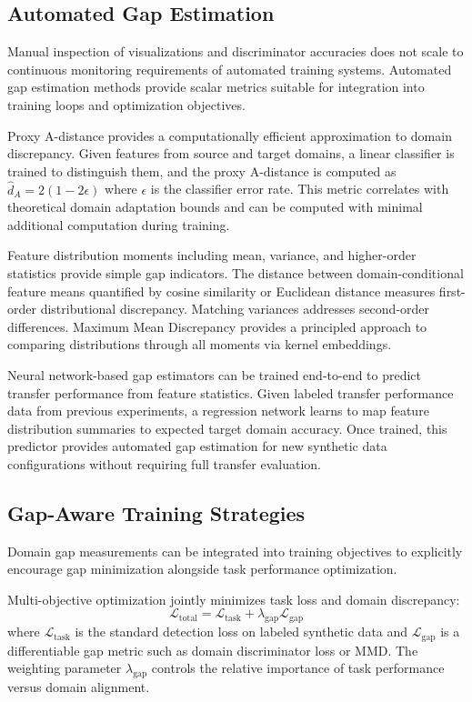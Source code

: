 \subsection{Automated Gap Estimation}

Manual inspection of visualizations and discriminator accuracies does not scale to continuous monitoring requirements of automated training systems. Automated gap estimation methods provide scalar metrics suitable for integration into training loops and optimization objectives.

Proxy A-distance provides a computationally efficient approximation to domain discrepancy. Given features from source and target domains, a linear classifier is trained to distinguish them, and the proxy A-distance is computed as $\hat{d}_A = 2(1 - 2\epsilon)$ where $\epsilon$ is the classifier error rate. This metric correlates with theoretical domain adaptation bounds and can be computed with minimal additional computation during training.

Feature distribution moments including mean, variance, and higher-order statistics provide simple gap indicators. The distance between domain-conditional feature means quantified by cosine similarity or Euclidean distance measures first-order distributional discrepancy. Matching variances addresses second-order differences. Maximum Mean Discrepancy provides a principled approach to comparing distributions through all moments via kernel embeddings.

Neural network-based gap estimators can be trained end-to-end to predict transfer performance from feature statistics. Given labeled transfer performance data from previous experiments, a regression network learns to map feature distribution summaries to expected target domain accuracy. Once trained, this predictor provides automated gap estimation for new synthetic data configurations without requiring full transfer evaluation.

\subsection{Gap-Aware Training Strategies}

Domain gap measurements can be integrated into training objectives to explicitly encourage gap minimization alongside task performance optimization.

Multi-objective optimization jointly minimizes task loss and domain discrepancy:
\begin{equation}
\mathcal{L}_{\text{total}} = \mathcal{L}_{\text{task}} + \lambda_{\text{gap}} \mathcal{L}_{\text{gap}}
\end{equation}
where $\mathcal{L}_{\text{task}}$ is the standard detection loss on labeled synthetic data and $\mathcal{L}_{\text{gap}}$ is a differentiable gap metric such as domain discriminator loss or MMD. The weighting parameter $\lambda_{\text{gap}}$ controls the relative importance of task performance versus domain alignment.

